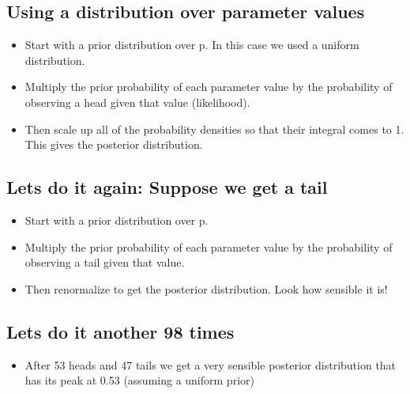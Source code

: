 \documentclass[11pt]{article}
\theoremstyle{definition}
\begin{document}
\subsection{Using a distribution over parameter values}
\begin{itemize}
    \item Start with a prior distribution over
    p. In this case we used a uniform
    distribution.
    \item Multiply the prior probability of
    each parameter value by the
    probability of observing a head
    given that value (likelihood).
    \item Then scale up all of the probability
    densities so that their integral
    comes to 1. This gives the
    posterior distribution.
\end{itemize}


\subsection{Lets do it again: Suppose we get a tail}
\begin{itemize}
    \item Start with a prior distribution
    over p.
    \item Multiply the prior probability
    of each parameter value by
    the probability of observing
    a tail given that value.
    \item Then renormalize to get the
    posterior distribution. Look
    how sensible it is!
\end{itemize}

\subsection{Lets do it another 98 times}

\begin{itemize}
    \item After 53 heads and 47
    tails we get a very
    sensible posterior
    distribution that has its
    peak at 0.53 (assuming a
    uniform prior)
\end{itemize}
\end{document}
